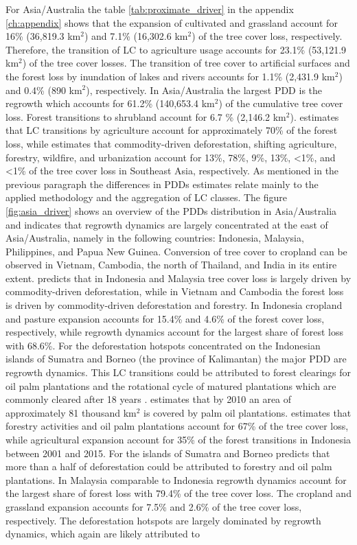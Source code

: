 			For Asia/Australia the table \ref{tab:proximate_driver} in the appendix \ref{ch:appendix} shows that the expansion of cultivated and grassland account for 16\% (36,819.3 km$^2$) and 7.1\% (16,302.6 km$^2$) of the tree cover loss, respectively. Therefore, the transition of \ac{LC} to agriculture usage accounts for 23.1\% (53,121.9 km$^2$) of the tree cover losses. The transition of tree cover to artificial surfaces and the forest loss by inundation of lakes and rivers accounts for 1.1\% (2,431.9 km$^2$) and 0.4\% (890 km$^2$), respectively. In Asia/Australia the largest \ac{PDD} is the regrowth which accounts for 61.2\% (140,653.4 km$^2$) of the cumulative tree cover loss. Forest transitions to shrubland account for 6.7 \% (2,146.2 km$^2$). \citet{Hosonuma2012} estimates that \ac{LC} transitions by agriculture account for approximately 70\% of the forest loss, while \citet{Curtis2018} estimates that commodity-driven deforestation, shifting agriculture, forestry, wildfire, and urbanization account for 13\%, 78\%, 9\%, 13\%, <1\%, and <1\% of the tree cover loss in Southeast Asia, respectively. As mentioned in the previous paragraph the differences in \acp{PDD} estimates relate mainly to the applied methodology and the aggregation of \ac{LC} classes. The figure \ref{fig:asia_driver} shows an overview of the \acp{PDD} distribution in Asia/Australia and indicates that regrowth dynamics are largely concentrated at the east of Asia/Australia, namely in the following countries: Indonesia, Malaysia, Philippines, and Papua New Guinea. Conversion of tree cover to cropland can be observed in Vietnam, Cambodia, the north of Thailand, and India in its entire extent. \citet{Curtis2018} predicts that in Indonesia and Malaysia tree cover loss is largely driven by commodity-driven deforestation, while in Vietnam and Cambodia the forest loss is driven by commodity-driven deforestation and forestry. In Indonesia cropland and pasture expansion accounts for 15.4\% and 4.6\% of the forest cover loss, respectively, while regrowth dynamics account for the largest share of forest loss with 68.6\%. For the deforestation hotspots concentrated on the Indonesian islands of Sumatra and Borneo (the province of Kalimantan) the major \ac{PDD} are regrowth dynamics. This \ac{LC} transitions could be attributed to forest clearings for oil palm plantations and the rotational cycle of matured plantations which are commonly cleared after 18 years \citep{Corley2016}. \citet{Corley2016} estimates that by 2010 an area of approximately 81 thousand km$^2$ is covered by palm oil plantations. \citet{Austin2019} estimates that forestry activities and oil palm plantations account for 67\% of the tree cover loss, while agricultural expansion account for 35\% of the forest transitions in Indonesia between 2001 and 2015. For the islands of Sumatra and Borneo \citet{Austin2019} predicts that more than a half of deforestation could be attributed to forestry and oil palm plantations. In Malaysia comparable to Indonesia regrowth dynamics account for the largest share of forest loss with 79.4\% of the tree cover loss. The cropland and grassland expansion accounts for 7.5\% and 2.6\% of the tree cover loss, respectively. The deforestation hotspots are largely dominated by regrowth dynamics, which again are likely attributed to 